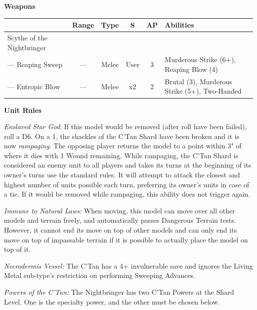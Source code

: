 \begin{minipage}[t]{0.72\textwidth}
	\vspace*{2em}
	\textbf{Weapons}
	
	\begin{tabular}{m{95 pt} *{4}{c} >{\raggedright\arraybackslash}p{130pt}}
		& Range & Type & S & AP & Abilities \\
		\hline
		Scythe of the Nightbringer & & & & & \\
		— Reaping Sweep & — & Melee & User & 3 & Murderous Strike (6+), Reaping Blow (4) \\
		— Entropic Blow & — & Melee & x2 & 2 & Brutal (3), Murderous Strike (5+), Two-Handed \\
	\end{tabular}
	
	\vspace*{2em}
	\textbf{Unit Rules}
		
	\textit{Enslaved Star God}: If this model would be removed (after  roll have been failed), roll a D6. On a 1, the shackles of the C'Tan Shard have been broken and it is now \textit{rampaging}. The opposing player returns the model to a point within 3" of where it dies with 1 Wound remaining. While rampaging, the C'Tan Shard is considered an enemy unit to all players and takes its turns at the beginning of its owner's turns use the standard rules. It will attempt to attack the closest and highest number of units possible each turn, preferring its owner's units in case of a tie. If it would be removed while rampaging, this ability does not trigger again.
	
	\textit{Immune to Natural Laws:} When moving, this model can move over all other models and terrain freely, and automatically passes Dangerous Terrain tests. However, it cannot end its move on top of other models and can only end its move on top of impassable terrain if it is possible to actually place the model on top of it.
	
	\textit{Necrodermis Vessel:} The C'Tan has a 4+ invulnerable save and ignores the Living Metal sub-type's restriction on performing Sweeping Advances.
	
	\textit{Powers of the C'Tan:} The Nightbringer has two C'Tan Powers at the Shard Level. One is the  specialty power, and the other must be chosen below.
	

\end{minipage}
